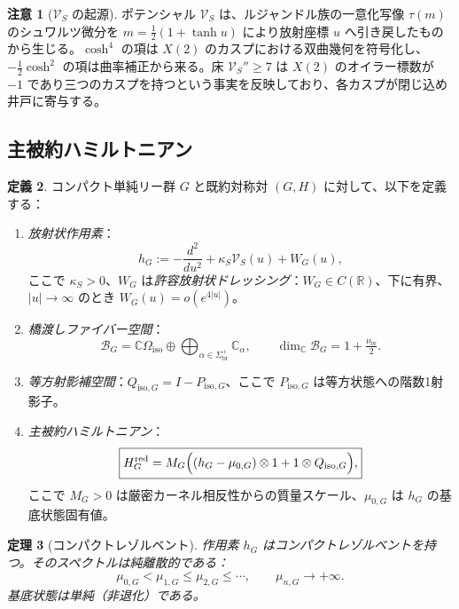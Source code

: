 \documentclass[12pt]{article}
\theoremstyle{plain}
\newtheorem{theorem}{定理}[section]
\theoremstyle{definition}
\newtheorem{definition}[theorem]{定義}
\newtheorem{remark}[theorem]{注意}
\numberwithin{equation}{section}
\newcommand{\R}{\mathbb{R}}
\newcommand{\C}{\mathbb{C}}
\newcommand{\red}{\mathrm{red}}
\newcommand{\br}{\mathrm{br}}
\newcommand{\iso}{\mathrm{iso}}
\begin{document}
\begin{remark}[$\mathcal{V}_S$ の起源]
ポテンシャル $\mathcal{V}_S$ は、ルジャンドル族の一意化写像 $\tau(m)$ のシュワルツ微分を $m=\frac{1}{2}(1+\tanh u)$ により放射座標 $u$ へ引き戻したものから生じる。$\cosh^4$ の項は $X(2)$ のカスプにおける双曲幾何を符号化し、$-\frac{1}{2}\cosh^2$ の項は曲率補正から来る。床 $\mathcal{V}_S''\geq 7$ は $X(2)$ のオイラー標数が $-1$ であり三つのカスプを持つという事実を反映しており、各カスプが閉じ込め井戸に寄与する。
\end{remark}

\subsection{主被約ハミルトニアン}

\begin{definition}\label{def:reducedHam}
コンパクト単純リー群 $G$ と既約対称対 $(G,H)$ に対して、以下を定義する：
\begin{enumerate}[label=(\roman*)]
\item \emph{放射状作用素}：
\begin{equation}
h_G := -\frac{d^2}{du^2} + \kappa_S\mathcal{V}_S(u) + W_G(u),
\end{equation}
ここで $\kappa_S>0$、$W_G$ は\emph{許容放射状ドレッシング}：$W_G\in C(\R)$、下に有界、$|u|\to\infty$ のとき $W_G(u)=o(e^{4|u|})$。

\item \emph{橋渡しファイバー空間}：
\begin{equation}
\mathcal{B}_G = \C\Omega_{\iso}\oplus\bigoplus_{\alpha\in\Sigma_{\br}^+}\C_\alpha,
\qquad \dim_\C\mathcal{B}_G = 1+\tfrac{\nu_{\br}}{2}.
\end{equation}

\item \emph{等方射影補空間}：$Q_{\iso,G}=I-P_{\iso,G}$、ここで $P_{\iso,G}$ は等方状態への階数1射影子。

\item \emph{主被約ハミルトニアン}：
\begin{equation}
\boxed{H_G^{\red} = M_G\Bigl((h_G-\mu_{0,G})\otimes 1 + 1\otimes Q_{\iso,G}\Bigr),}
\end{equation}
ここで $M_G>0$ は厳密カーネル相反性からの質量スケール、$\mu_{0,G}$ は $h_G$ の基底状態固有値。
\end{enumerate}
\end{definition}

\begin{theorem}[コンパクトレゾルベント]\label{thm:compactresolvent}
作用素 $h_G$ はコンパクトレゾルベントを持つ。そのスペクトルは純離散的である：
\begin{equation}
\mu_{0,G} < \mu_{1,G} \leq \mu_{2,G} \leq \cdots,\qquad \mu_{n,G}\to+\infty.
\end{equation}
基底状態は単純（非退化）である。
\end{theorem}
\end{document}
